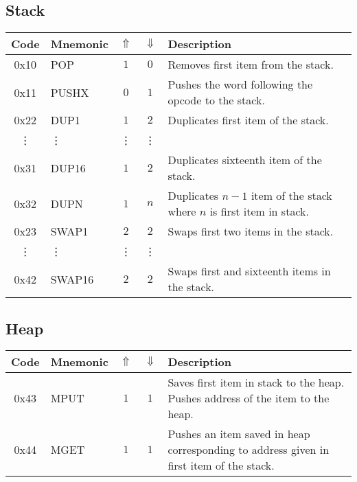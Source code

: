 \documentclass[12pt,a4paper]{article}
\begin{document}
\subsection{Stack}
\begin{tabularx}{\textwidth}{ c l c c p{7cm} }
\textbf{Code} & \textbf{Mnemonic} & \textbf{$\Uparrow$} & \textbf{$\Downarrow$} & \textbf{Description} \\
\hline
0x10 & POP & $1$ & $0$ & Removes first item from the stack. \\
\hline
0x11 & PUSHX & $0$ & $1$ & Pushes the word following the opcode to the stack. \\
\hline
0x22 & DUP1 & $1$ & $2$ & Duplicates first item of the stack. \\
\vdots & \vdots & \vdots & \vdots \\
0x31 & DUP16 & $1$ & $2$ & Duplicates sixteenth item of the stack. \\
\hline
0x32 & DUPN & $1$ & $n$ & Duplicates $n-1$ item of the stack where $n$ is first item in stack. \\
\hline
0x23 & SWAP1 & $2$ & $2$ & Swaps first two items in the stack. \\
\vdots & \vdots & \vdots & \vdots \\
0x42 & SWAP16 & $2$ & $2$ & Swaps first and sixteenth items in the stack. \\
\hline
\end{tabularx}

\subsection{Heap}
\begin{tabularx}{\textwidth}{ c l c c p{7cm} }
\textbf{Code} & \textbf{Mnemonic} & \textbf{$\Uparrow$} & \textbf{$\Downarrow$} & \textbf{Description} \\
\hline
0x43 & MPUT & $1$ & $1$ & Saves first item in stack to the heap. Pushes address of the item to the heap. \\
\hline
0x44 & MGET & $1$ & $1$ & Pushes an item saved in heap corresponding to address given in first item of the stack.  \\
\hline
\end{tabularx}
\end{document}
